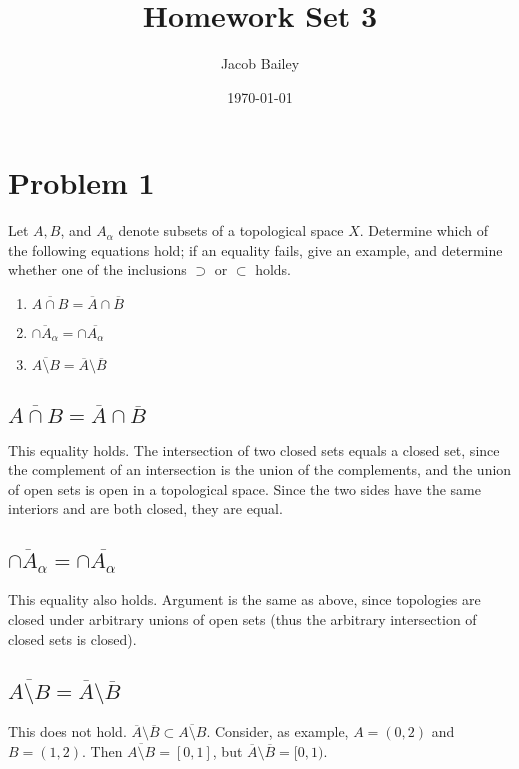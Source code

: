 \documentclass[11pt]{article}
\author{Jacob Bailey}
\date{\today}
\title{Homework Set 3}
\begin{document}
\maketitle

\section{Problem 1}
\label{sec:org7fad07b}

Let \(A,B\), and \(A_{\alpha}\) denote subsets of a topological space
\(X\). Determine which of the following equations hold; if an equality
fails, give an example, and determine whether one of the inclusions
\(\supset\) or \(\subset\) holds.

\begin{enumerate}
\item \(\overline{A\cap B} = \overline{A}\cap\overline{B}\)
\item \(\overline{\cap A_{\alpha}} = \cap\overline{A_{\alpha}}\)
\item \(\overline{A\setminus B} = \overline{A}\setminus\overline{B}\)
\end{enumerate}


\subsection{\(\overline{A\cap B} = \overline{A}\cap\overline{B}\)}
\label{sec:org90fa121}
This equality holds. The intersection of two closed sets equals a
closed set, since the complement of an intersection is the union of
the complements, and the union of open sets is open in a topological
space. Since the two sides have the same interiors and are both
closed, they are equal. 

\subsection{\(\overline{\cap A_{\alpha}} = \cap\overline{A_{\alpha}}\)}
\label{sec:org84de64e}
This equality also holds. Argument is the same as above, since
topologies are closed under arbitrary unions of open sets (thus the
arbitrary intersection of closed sets is closed). 

\subsection{\(\overline{A\setminus B} = \overline{A}\setminus\overline{B}\)}
\label{sec:orgab81722}
This does not hold. \(\overline{A}\setminus\overline{B} \subset
\overline{A\setminus B}\). Consider, as example, \(A = (0,2)\) and \(B =
(1,2)\). Then \(\overline{A\setminus B} = [0,1]\), but
\(\overline{A}\setminus\overline{B} = [0,1)\).
\end{document}

